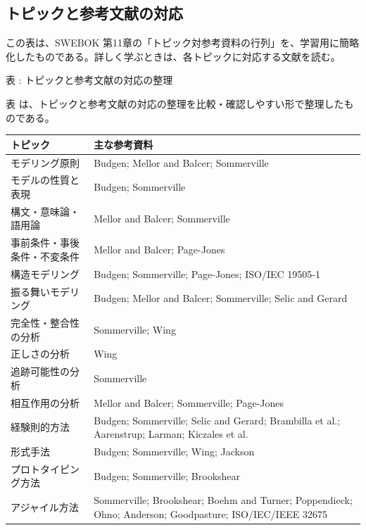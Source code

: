 \subsection{トピックと参考文献の対応}
この表は、SWEBOK 第11章の「トピック対参考資料の行列」を、学習用に簡略化したものである。詳しく学ぶときは、各トピックに対応する文献を読む。

\par\smallskip\noindent{}\label{tab:ch11-10}表 \thetable: トピックと参考文献の対応の整理\par\smallskip
表 \thetable は、トピックと参考文献の対応の整理を比較・確認しやすい形で整理したものである。\par\smallskip
\begin{longtable}{>{\raggedright\arraybackslash}p{}>{\raggedright\arraybackslash}p{}}
\toprule
トピック & 主な参考資料 \\
\midrule
モデリング原則 & Budgen; Mellor and Balcer; Sommerville \\
モデルの性質と表現 & Budgen; Sommerville \\
構文・意味論・語用論 & Mellor and Balcer; Sommerville \\
事前条件・事後条件・不変条件 & Mellor and Balcer; Page-Jones \\
構造モデリング & Budgen; Sommerville; Page-Jones; ISO/IEC 19505-1 \\
振る舞いモデリング & Budgen; Mellor and Balcer; Sommerville; Selic and Gerard \\
完全性・整合性の分析 & Sommerville; Wing \\
正しさの分析 & Wing \\
追跡可能性の分析 & Sommerville \\
相互作用の分析 & Mellor and Balcer; Sommerville; Page-Jones \\
経験則的方法 & Budgen; Sommerville; Selic and Gerard; Brambilla et al.; Aarenstrup; Larman; Kiczales et al. \\
形式手法 & Budgen; Sommerville; Wing; Jackson \\
プロトタイピング方法 & Budgen; Sommerville; Brookshear \\
アジャイル方法 & Sommerville; Brookshear; Boehm and Turner; Poppendieck; Ohno; Anderson; Goodpasture; ISO/IEC/IEEE 32675 \\
\bottomrule
\end{longtable}
